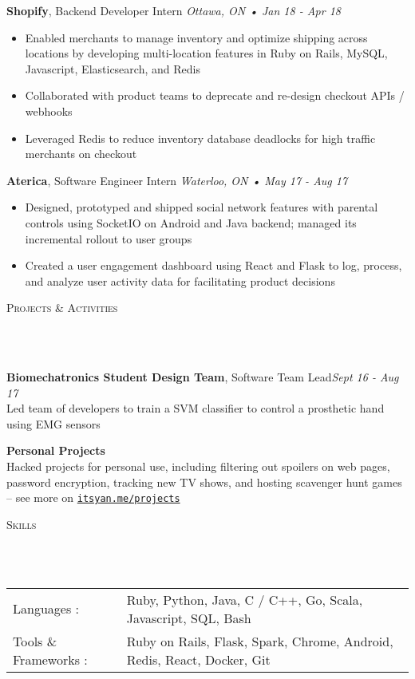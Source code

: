 \documentclass[a4paper, 11pt, hidelinks]{article}
\newcommand{\lineunder} {
    \vspace*{-8pt} \\
    \hrulefill \\
}
\newcommand{\header} [1] {
    {\hspace*{-4pt}\vspace*{6pt} \textsc{#1}}
    \vspace*{-6pt}
    \lineunder
    \vspace{6pt}
}
\begin{document}
\textbf{Shopify}, Backend Developer Intern \hfill\textit{Ottawa, ON • Jan 18 - Apr 18}\\
\vspace{-2mm}
\begin{itemize}[leftmargin=2em] \itemsep 1pt
	\item Enabled merchants to manage inventory and optimize shipping across locations by developing
    multi-location features in Ruby on Rails, MySQL, Javascript, Elasticsearch, and Redis
	\item Collaborated with product teams to deprecate and re-design checkout APIs / webhooks
	\item Leveraged Redis to reduce inventory database deadlocks for high traffic merchants on checkout
\end{itemize}

\textbf{Aterica}, Software Engineer Intern \hfill\textit{Waterloo, ON • May 17 - Aug 17}\\
\vspace{-2mm}
\begin{itemize}[leftmargin=2em] \itemsep 1pt
	\item Designed, prototyped and shipped social network features with parental controls using SocketIO on
    Android and Java backend; managed its incremental rollout to user groups
	\item Created a user engagement dashboard using React and Flask to log, process, and analyze user activity
    data for facilitating product decisions
\end{itemize}

\header{Projects \& Activities}
{\textbf{Biomechatronics Student Design Team}, Software Team Lead}\hfill\textit{Sept 16 - Aug 17}\\
Led team of developers to train a SVM classifier to control a prosthetic hand using EMG sensors\\
\vspace{3mm}

{\textbf{Personal Projects}}\hfill\\
Hacked projects for personal use, including filtering out spoilers on web pages, password
encryption, tracking new TV shows, and hosting scavenger hunt games -- see more on
\texttt{\href{http://www.itsyan.me/projects}{itsyan.me/projects}}\\
\vspace{3mm}

\header{Skills}
\hspace{-10pt}
\begin{tabular}{ l l }
    Languages : & Ruby, Python, Java, C / C++, Go, Scala, Javascript, SQL, Bash \\
    Tools \& Frameworks : & Ruby on Rails, Flask, Spark, Chrome, Android, Redis, React, Docker, Git \\
\end{tabular}
\vspace{3mm}
\end{document}
